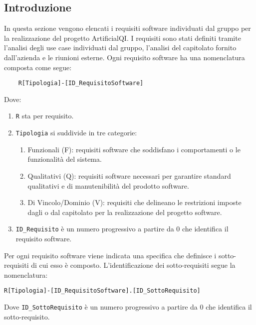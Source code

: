 

\subsection{Introduzione}
In questa sezione vengono elencati i requisiti software individuati dal gruppo per la realizzazione del progetto ArtificialQI.
I requisiti sono stati definiti tramite l'analisi degli use case individuati dal gruppo, l'analisi del capitolato fornito dall'azienda e le riunioni esterne.
Ogni requisito software ha una nomenclatura composta come segue:
\begin{lstlisting}
    R[Tipologia]-[ID_RequisitoSoftware]
\end{lstlisting}
Dove:
\begin{enumerate}
    \item \lstinline|R| sta per requisito.
    \item \lstinline|Tipologia| si suddivide in tre categorie:
    \begin{enumerate}
        \item Funzionali (F): requisiti software che soddisfano i comportamenti o le funzionalità del sistema.
        \item Qualitativi (Q): requisiti software necessari per garantire standard qualitativi e di manutenibilità
        del prodotto software.
        \item Di Vincolo/Dominio (V): requisiti che delineano le restrizioni imposte dagli  o dal capitolato 
        per la realizzazione del progetto software.
    \end{enumerate}
    \item \lstinline|ID_Requisito| è un numero progressivo a partire da 0 che identifica il requisito software.
\end{enumerate}  
Per ogni requisito software viene indicata una specifica che definisce i sotto-requisiti di cui esso è composto.
L'identificazione dei sotto-requisiti segue la nomenclatura:
\begin{lstlisting}
R[Tipologia]-[ID_RequisitoSoftware].[ID_SottoRequisito]
\end{lstlisting} 
Dove \lstinline|ID_SottoRequisito| è un numero progressivo a partire da 0 che identifica il sotto-requisito.
